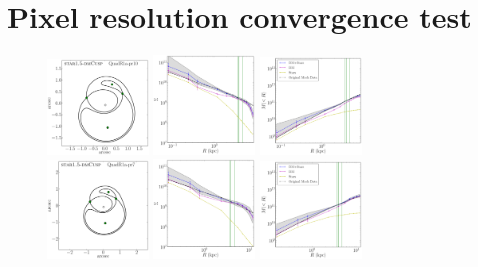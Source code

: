 \documentclass[galley,usenatbib]{mn2e}
\begin{document}
\section{Pixel resolution convergence test}
\begin{figure}
\includegraphics[width=0.24\textwidth]{BCQuadR1a-pr10_TmS-a.pdf}
\includegraphics[width=0.24\textwidth]{BCQuadR1a-pr10_TmS-b.pdf}
\includegraphics[width=0.24\textwidth]{BCQuadR1a-pr10_TmS-c.pdf} \\
\includegraphics[width=0.24\textwidth]{BCQuadR1a-pr7_TmS-a.pdf}
\includegraphics[width=0.24\textwidth]{BCQuadR1a-pr7_TmS-b.pdf}
\includegraphics[width=0.24\textwidth]{BCQuadR1a-pr7_TmS-c.pdf} \\

\end{figure}
\end{document}
